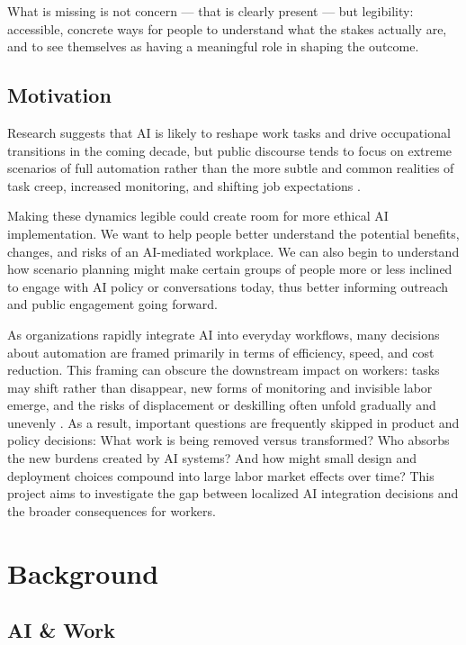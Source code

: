 \documentclass[sigconf,authordraft]{acmart}
\begin{document}
What is missing is not concern — that is clearly present — but legibility: accessible, concrete ways for people to understand what the stakes actually are, and to see themselves as having a meaningful role in shaping the outcome.


\subsection{Motivation}

Research suggests that AI is likely to reshape work tasks and drive occupational transitions in the coming decade, but public discourse tends to focus on extreme scenarios of full automation rather than the more subtle and common realities of task creep, increased monitoring, and shifting job expectations \cite{acemoglu2022tasks} \cite{acemoglu2025simple}.

Making these dynamics legible could create room for more ethical AI implementation. We want to help people better understand the potential benefits, changes, and risks of an AI-mediated workplace. We can also begin to understand how scenario planning might make certain groups of people more or less inclined to engage with AI policy or conversations today, thus better informing outreach and public engagement going forward.

As organizations rapidly integrate AI into everyday workflows, many decisions about automation are framed primarily in terms of efficiency, speed, and cost reduction. This framing can obscure the downstream impact on workers: tasks may shift rather than disappear, new forms of monitoring and invisible labor emerge, and the risks of displacement or deskilling often unfold gradually and unevenly \cite{acemoglu2022tasks} \cite{acemoglu2025simple}. As a result, important questions are frequently skipped in product and policy decisions: What work is being removed versus transformed? Who absorbs the new burdens created by AI systems? And how might small design and deployment choices compound into large labor market effects over time? This project aims to investigate the gap between localized AI integration decisions and the broader consequences for workers.





\section{Background}


\subsection{AI \& Work}
\end{document}
